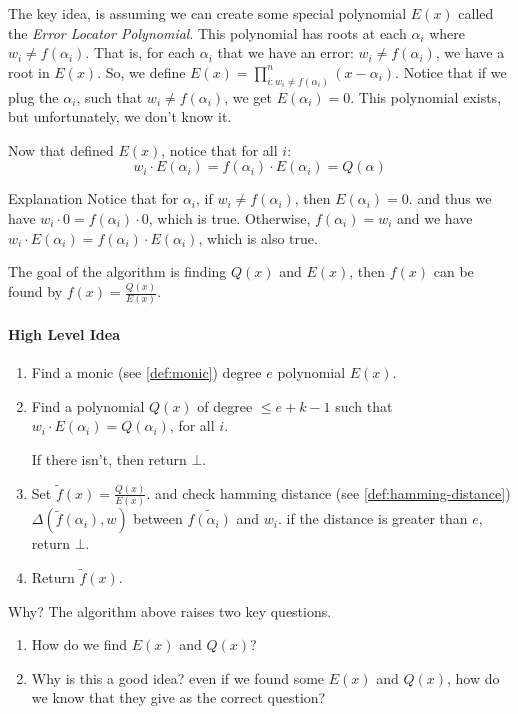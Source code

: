 The key idea, is assuming we can create some special polynomial $E(x)$ called the \emph{Error Locator Polynomial}.
This polynomial has roots at each $\alpha_i$ where $w_i\ne f(\alpha_i)$. That is, 
for each $\alpha_i$  that we have an error: $w_i\ne f(\alpha_i)$, we have a root in $E(x)$.
So, we define $ E(x) = \prod_{i:w_i\ne f(\alpha_i)}^{n} (x-\alpha_i)$.
Notice that if we plug the $\alpha_i$, such that $w_i\ne f(\alpha_i)$, we get $E(\alpha_i)=0$.
This polynomial exists, but unfortunately, we don't know it. 

Now that defined $E(x)$, notice that for all $i$:
$$ w_i\cdot E(\alpha_i) = f(\alpha_i)\cdot E(\alpha_i)= Q(\alpha)$$


\begin{bclogo}[logo=\bcinfo,noborder=true]{Explanation}
    Notice that for $\alpha_i$, if $w_i\ne f(\alpha_i)$, then $E(\alpha_i)=0$.
    and thus we have $w_i\cdot 0 = f(\alpha_i)\cdot 0$, which is true.
    Otherwise, $f(\alpha_i)=w_i$ and we have
     $w_i\cdot E(\alpha_i) = f(\alpha_i)\cdot E(\alpha_i)$, which is also true.
\end{bclogo}

The goal of the algorithm is finding $Q(x)$ and $E(x)$,
 then $f(x)$ can be found by $f(x)=\frac{Q(x)}{E(x)}$.

\paragraph{High Level Idea}
\begin{enumerate}
    \item Find a monic (see \autoref{def:monic}) degree $e$ polynomial $E(x)$.
    \item Find a polynomial $Q(x)$ of degree $\le e+k-1$ such 
    that $w_i\cdot E(\alpha_i)=Q(\alpha_i)$, for all $i$.

    If there isn't, then return $\bot$.
    \item Set $\tilde{f}(x)=\frac{Q(x)}{E(x)}$. and check hamming distance 
    (see \autoref{def:hamming-distance}) $\Delta(\tilde{f}(\alpha_i),w)$ 
    between $\tilde{f(\alpha_i)}$ and $w_i$.
    if the distance is greater than $e$, return $\bot$.
    \item Return $\tilde{f}(x)$.
\end{enumerate}


\begin{bclogo}[logo=\bcquestion]{Why?}
    The algorithm above raises two key questions.
    \begin{enumerate}
        \item How do we find $E(x)$ and $Q(x)$?
        \item Why is this a good idea? even if we found some $E(x)$ and $Q(x)$, 
        how do we know that they give as the correct question?
    \end{enumerate}    
\end{bclogo}


